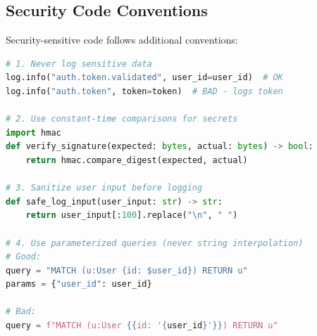 \subsection{Security Code Conventions}

Security-sensitive code follows additional conventions:

\begin{lstlisting}[language=Python, caption={Security coding conventions.}]
# 1. Never log sensitive data
log.info("auth.token.validated", user_id=user_id)  # OK
log.info("auth.token", token=token)  # BAD - logs token

# 2. Use constant-time comparisons for secrets
import hmac
def verify_signature(expected: bytes, actual: bytes) -> bool:
    return hmac.compare_digest(expected, actual)

# 3. Sanitize user input before logging
def safe_log_input(user_input: str) -> str:
    return user_input[:100].replace("\n", " ")

# 4. Use parameterized queries (never string interpolation)
# Good:
query = "MATCH (u:User {id: $user_id}) RETURN u"
params = {"user_id": user_id}

# Bad:
query = f"MATCH (u:User {{id: '{user_id}'}}) RETURN u"
\end{lstlisting}

